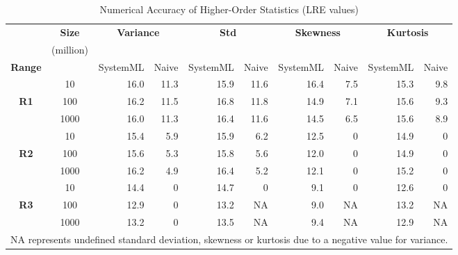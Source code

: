 
\begin{table*}[thb]
\caption{Numerical Accuracy of Higher-Order Statistics (LRE values)}
\label{tab:univariate}
\centering
\begin{tabular}{|c|c|r|r|r|r|r|r|r|r|}
\hline
 & \textbf{Size} & \multicolumn{2}{|c|}{\textbf{Variance}} & \multicolumn{2}{|c|}{\textbf{Std}} & \multicolumn{2}{|c|}{\textbf{Skewness}} & \multicolumn{2}{|c|}{\textbf{Kurtosis}}\\
 & (million) & \multicolumn{2}{|c|}{} & \multicolumn{2}{|c|}{} & \multicolumn{2}{|c|}{} & \multicolumn{2}{|c|}{}\\
\hline
\textbf{Range} & & SystemML & Naive & SystemML & Naive & SystemML & Naive & SystemML & Naive\\ 
\hline
             & 10   & 16.0 & 11.3 & 15.9 & 11.6 & 16.4 & 7.5 & 15.3 & 9.8 \\
\textbf{R1}  & 100  & 16.2 & 11.5 & 16.8 & 11.8 & 14.9 & 7.1 & 15.6 & 9.3 \\
             & 1000 & 16.0 & 11.3 & 16.4 & 11.6 & 14.5 & 6.5 & 15.6 & 8.9 \\
\hline
\hline
             & 10   & 15.4 & 5.9  & 15.9 & 6.2  & 12.5 & 0   & 14.9 & 0 \\
\textbf{R2}  & 100  & 15.6 & 5.3  & 15.8 & 5.6  & 12.0 & 0   & 14.9 & 0 \\
             & 1000 & 16.2 & 4.9  & 16.4 & 5.2  & 12.1 & 0   & 15.2 & 0 \\
\hline
\hline
             & 10   & 14.4 & 0    & 14.7 & 0    & 9.1  & 0   & 12.6  & 0 \\
\textbf{R3}  & 100  & 12.9 & 0    & 13.2 & NA   & 9.0  & NA  & 13.2  & NA \\
             & 1000 & 13.2 & 0    & 13.5 & NA   & 9.4  & NA  & 12.9 & NA \\
\hline
\multicolumn{10}{c}{NA represents undefined standard deviation, skewness or kurtosis due to a negative value for variance.}
\end{tabular}
\end{table*}

